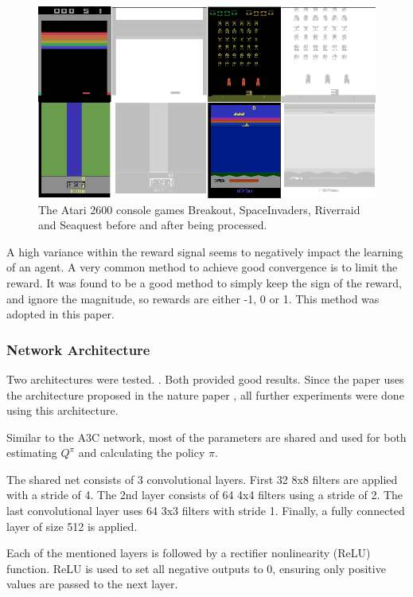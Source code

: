 \begin{figure}
\includegraphics[scale=0.5]{bilder/atarienv.png}
\caption{The Atari 2600 console games Breakout, SpaceInvaders, Riverraid and Seaquest before and after being processed.}
\end{figure}

A high variance within the reward signal seems to negatively impact the learning of an agent.
A very common method to achieve good convergence is to limit the reward. 
It was found to be a good method to simply keep the sign of the reward, and ignore the magnitude, so rewards are either -1, 0 or 1. This method was adopted in this paper.


\subsubsection{Network Architecture}

Two architectures were tested. \citep{mnih2015atari} \citep{nature}.
Both provided good results. Since the paper uses the architecture proposed in the nature paper \citep{nature}, all further experiments were done using this architecture.

Similar to the A3C \citep{A3C} network, most of the parameters are shared and used for both estimating $Q^\pi$ and calculating the policy $\pi$.

The shared net consists of 3 convolutional layers.
First 32 8x8 filters are applied with a stride of 4.
The 2nd layer consists of 64 4x4 filters using a stride of 2.
The last convolutional layer uses 64 3x3 filters with stride 1.
Finally, a fully connected layer of size 512 is applied.

Each of the mentioned layers is followed by a rectifier nonlinearity (ReLU) function.
ReLU is used to set all negative outputs to 0, ensuring only positive values are passed to the next layer.

